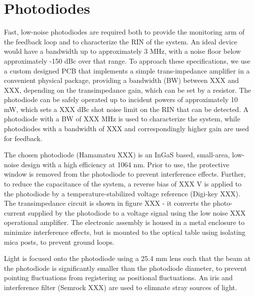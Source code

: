 \documentclass[twocolumn,aps,pra,showpacs,preprintnumbers,bibnotes]{revtex4-1}
\begin{document}
\section{Photodiodes}
Fast, low-noise photodiodes are required both to provide the monitoring arm of the feedback loop and to characterize the RIN of the system.
An ideal device would have a bandwidth up to approximately 3 MHz, with a noise floor below approximately -150 dBc over that range.
To approach these specifications, we use a custom designed PCB that implements a simple trans-impedance amplifier in a convenient physical package, providing a bandwidth (BW) between XXX and XXX, depending on the transimpedance gain, which can be set by a resistor. 
The photodiode can be safely operated up to incident powers of approximately 10 mW, which sets a XXX dBc shot noise limit on the RIN that can be detected.
A photodiode with a BW of XXX MHz is used to characterize the system, while photodiodes with a bandwidth of XXX and correspondingly higher gain are used for feedback.

The chosen photodiode (Hamamatsu XXX) is an InGaS based, small-area, low-noise design with a high efficiency at 1064 nm.
Prior to use, the protective window is removed from the photodiode to prevent interference effects.
Further, to reduce the capacitance of the system, a reverse bias of XXX V is applied to the photodiode by a temperature-stabilized voltage reference (Digi-key XXX).
The transimpedance circuit is shown in figure XXX - it converts the photo-current supplied by the photodiode to a voltage signal using the low noise XXX operational amplifier. 
The electronic assembly is housed in a metal enclosure to minimize interference effects, but is mounted to the optical table using isolating mica posts, to prevent ground loops. 

Light is focused onto the photodiode using a 25.4 mm lens such that the beam at the photodiode is significantly smaller than the photodiode diameter, to prevent pointing fluctuations from registering as positional fluctuations. 
An iris and interference filter (Semrock XXX) are used to elimnate stray sources of light. 
\end{document}
